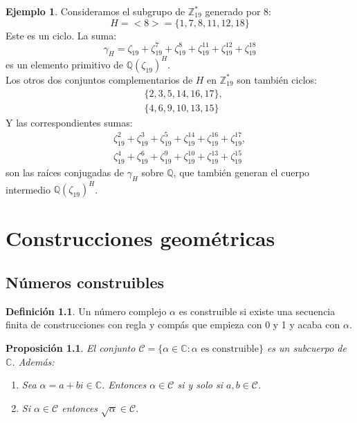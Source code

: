 \documentclass{report}
\newtheorem{proposition}[theorem]{Proposición}
\theoremstyle{remark}
\theoremstyle{definition}
\newtheorem{definition}{Definición}[chapter]
\theoremstyle{definition}
\theoremstyle{definition}
\newtheorem*{example}{Ejemplo}
\begin{document}
\begin{example}
    Consideramos el subgrupo de $\mathbb{Z}^*_{19}$ generado por 8:
    $$H = < 8 > = \{ 1, 7, 8, 11, 12, 18 \}$$
    Este es un ciclo. La suma:
    $$\gamma_H = \zeta_{19} + \zeta^7_{19} + \zeta^8_{19} + \zeta^{11}_{19} + \zeta^{12}_{19} + \zeta^{18}_{19}$$
    es un elemento primitivo de $\mathbb{Q}(\zeta_{19})^H$.\\
    Los otros dos conjuntos complementarios de $H$ en $\mathbb{Z}^*_{19}$ son también ciclos:
    \begin{align*}
         & \{ 2, 3, 5, 14, 16, 17 \}, \\
         & \{ 4, 6, 9, 10, 13, 15 \}
    \end{align*}
    Y las correspondientes sumas:
    \begin{align*}
        \zeta^2_{19} + \zeta^3_{19} + \zeta^5_{19} + \zeta^{14}_{19} + \zeta^{16}_{19} + \zeta^{17}_{19}, \\
        \zeta^4_{19} + \zeta^6_{19} + \zeta^9_{19} + \zeta^{10}_{19} + \zeta^{13}_{19} + \zeta^{15}_{19}
    \end{align*}
    son las raíces conjugadas de $\gamma_H$ sobre $\mathbb{Q}$, que también generan el cuerpo intermedio $\mathbb{Q}(\zeta_{19})^H$.
\end{example}

\chapter{Construcciones geométricas}
\section{Números construibles}

\begin{definition}
    Un número complejo $\alpha$ es construible si existe una  secuencia finita de construcciones con regla y compás que empieza con 0 y 1 y acaba con $\alpha$.
\end{definition}

\begin{proposition}
    El conjunto $\mathcal{C} = \{ \alpha \in \mathbb{C} : \alpha \text{ es construible} \}$ es un subcuerpo de $\mathbb{C}$. Además:
    \begin{enumerate}
        \item Sea $\alpha = a + bi \in \mathbb{C}$. Entonces $\alpha \in \mathcal{C}$ si y solo si $a, b \in \mathcal{C}$.
        \item Si $\alpha \in \mathcal{C}$ entonces $\sqrt{\alpha} \in \mathcal{C}$.
    \end{enumerate}
\end{proposition}
\end{document}
